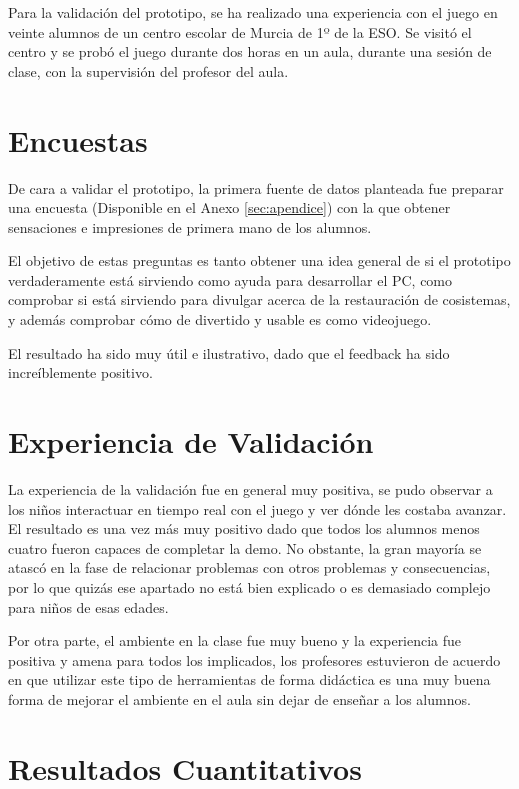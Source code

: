 Para la validación del prototipo, se ha realizado una experiencia con el juego en veinte alumnos de un centro escolar de Murcia de 1º de la ESO. Se visitó el centro y se probó el juego durante dos horas en un aula, durante una sesión de clase, con la supervisión del profesor del aula.

\section{Encuestas}

De cara a validar el prototipo, la primera fuente de datos planteada fue preparar una encuesta (Disponible en el Anexo \ref{sec:apendice}) con la que obtener sensaciones e impresiones de primera mano de los alumnos.

El objetivo de estas preguntas es tanto obtener una idea general de si el prototipo verdaderamente está sirviendo como ayuda para desarrollar el PC, como comprobar si está sirviendo para divulgar acerca de la restauración de cosistemas, y además comprobar cómo de divertido y usable es como videojuego.

El resultado ha sido muy útil e ilustrativo, dado que el feedback ha sido increíblemente positivo. 

\section{Experiencia de Validación}

La experiencia de la validación fue en general muy positiva, se pudo observar a los niños interactuar en tiempo real con el juego y ver dónde
 les costaba avanzar. El resultado es una vez más muy positivo dado que todos los alumnos menos cuatro fueron capaces de completar la demo.
  No obstante, la gran mayoría se atascó en la fase de relacionar problemas con otros problemas y consecuencias, por lo que quizás ese apartado
   no está bien explicado o es demasiado complejo para niños de esas edades.

Por otra parte, el ambiente en la clase fue muy bueno y la experiencia fue positiva y amena para todos los implicados, los profesores estuvieron 
de acuerdo en que utilizar este tipo de herramientas de forma didáctica es una muy buena forma de mejorar el ambiente en el aula sin dejar de enseñar
 a los alumnos. 

\section{Resultados Cuantitativos}

